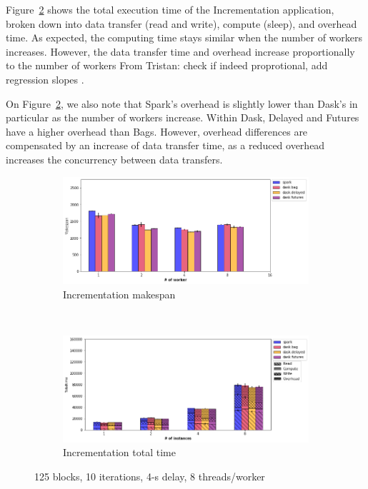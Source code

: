 \documentclass[conference]{IEEEtran}
\newcommand{\TG}[1]{\color{cyan}From Tristan: #1 \color{black}}
\begin{document}
Figure~\ref{fig:inc_tt_worker} shows the total execution time of the
Incrementation application, broken down into data transfer (read and
write), compute (sleep), and overhead time. As expected, the computing time
stays similar when the number of workers increases. However, the data
transfer time and overhead increase proportionally to the number of
workers \TG{check if indeed proprotional, add regression slopes}.

On Figure~\ref{fig:inc_tt_worker}, we also note that Spark's overhead is
slightly lower than Dask's in particular as the number of workers increase.
Within Dask, Delayed and Futures have a higher overhead than Bags. However,
overhead differences are compensated by an increase of data transfer time,
as a reduced overhead increases the concurrency between data transfers. 

\begin{figure}[!b]
    \centering
    \begin{subfigure}[b]{\columnwidth}
        \includegraphics[clip,width=\columnwidth]{images/inc_worker.png}%
        \caption{Incrementation makespan}\label{fig:inc_ms_worker}
    \end{subfigure}
    \\
    \begin{subfigure}[b]{\columnwidth}
        \includegraphics[clip,width=\columnwidth]{images/inc_idle_worker.png}%
        \caption{Incrementation total time}\label{fig:inc_tt_worker}
    \end{subfigure}
    \caption{125 blocks, 10 iterations, 4-s delay, 8 threads/worker}\label{fig:inc_worker}
\end{figure}
\end{document}

